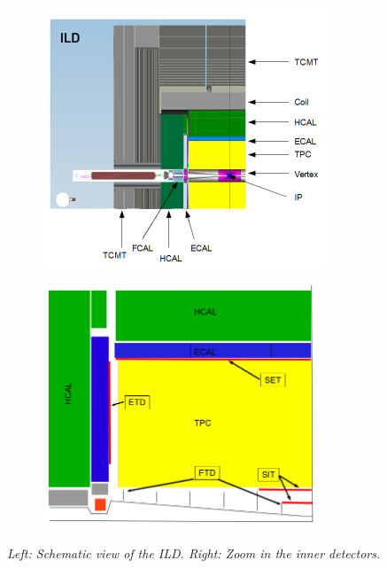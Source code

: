 \begin{figure}[H]
\centering
\begin{subfigure}{0.5\textwidth}
    \includegraphics[width=0.95\textwidth]{graphics/ILD.png}

\end{subfigure}%
  \begin{subfigure}{0.5\textwidth}
\centering
    \includegraphics[width=0.9\textwidth]{graphics/ILDtracking.png}

\end{subfigure}
    \caption{\sl Left: Schematic view of the ILD. Right: Zoom in the inner detectors.}
    \label{fig:ILDScheme}
\end{figure}


